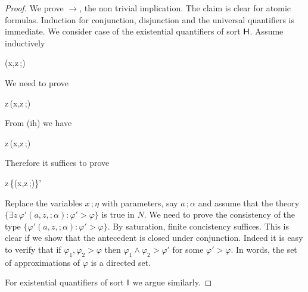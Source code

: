 \documentclass[10pt,oneside]{amsproc}
\def\existsH{\exists}
\begin{document}
\begin{proof}
  We prove $\rightarrow$, the non trivial implication.
  The claim is clear for atomic formulas.
  Induction for conjunction, disjunction and the universal quantifiers is immediate.
%
%
%
%
%
  We consider case of the existential quantifiers of sort ${\sf H}$.
  Assume inductively
  
  {\rightarrow}
  {\varphi(x,z\,;\eta)}

  We need to prove

  \ceq{\hfill\{\existsH z\,\varphi(x,z\,;\eta)\}'}
  {\rightarrow}
  {\existsH z\,\varphi(x,z\,;\eta)}

  From (ih) we have

  \ceq{\hfill\existsH z\,\{\varphi(x,z\,;\eta)\}'}
  {\rightarrow}
  {\existsH z\,\varphi(x,z\,;\eta)}

  Therefore it suffices to prove

  \ceq{\hfill\{\existsH z\,\varphi(x,z\,;\eta)\}'}
  {\rightarrow}
  {\existsH z\,\{\varphi(x,z\,;\eta)\}'}

Replace the variables $x\,;\eta$ with parameters, say $a\,;\alpha$ and assume that the theory $\{\existsH z\,\varphi'(a,z,;\alpha):\varphi'>\varphi\}$ is true in $N$.
We need to prove the consistency of the type $\{\varphi'(a,z,;\alpha):\varphi'>\varphi\}$.
By saturation, finite concistency suffices.
This is clear if we show that the antecedent is closed under conjunction.
Indeed it is easy to verify that if $\varphi_1,\varphi_2>\varphi$ then $\varphi_1\wedge\varphi_2>\varphi'$ for some $\varphi'>\varphi$.
In words, the set of approximations of $\varphi$ is a directed set.

For existential quantifiers of sort ${\sf I}$ we argue similarly.%
%
%
%
%
%
\end{proof}
\end{document}
